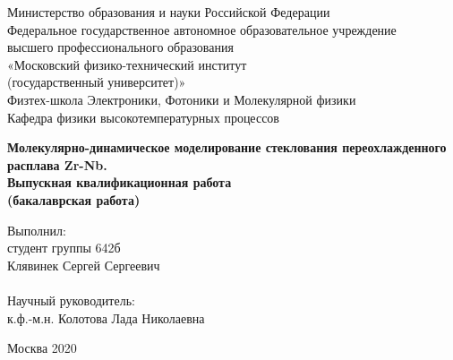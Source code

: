 \begin{titlepage}
	\newpage
	\begin{center}
		\thispagestyle{empty}
		
		\vspace{2cm}
		{Министерство образования и науки Российской Федерации\\} 
		\vspace{0.5cm}
		{Федеральное государственное автономное образовательное учреждение \\ высшего профессионального образования \\ «Московский физико-технический институт \\ 
			(государственный университет)»\\}
		\vspace{1cm}
		{Физтех-школа Электроники, Фотоники и Молекулярной физики\\}
		{Кафедра физики высокотемпературных процессов\\}
		
		\vspace{2cm}
		\bfseries
		{Молекулярно-динамическое моделирование стеклования переохлажденного расплава Zr-Nb.\\}
		\mdseries
		\vspace{0.5cm}
		{Выпускная квалификационная работа\\(бакалаврская работа)}
		\vspace{1.5cm}
		\begin{flushleft}
			{\noindent\hspace{7cm} Выполнил:\\}
			{\noindent\hspace{7cm} студент группы 642б\\
			 \noindent\hspace{7cm} Клявинек Сергей Сергеевич\\}
			\noindent\hspace{7cm} \hrulefill\\
			{\noindent\hspace{7cm} Научный руководитель:\\}
			{\noindent\hspace{7cm} к.ф.-м.н. Колотова Лада Николаевна\\}
			\noindent\hspace{7cm} \hrulefill
		\end{flushleft}
		\vspace{\fill}
		\begin{center}
			{Москва 2020\\}
		\end{center}
	\end{center}
\end{titlepage}
\color{black}{\tableofcontents}
\clearpage
\color{black}
